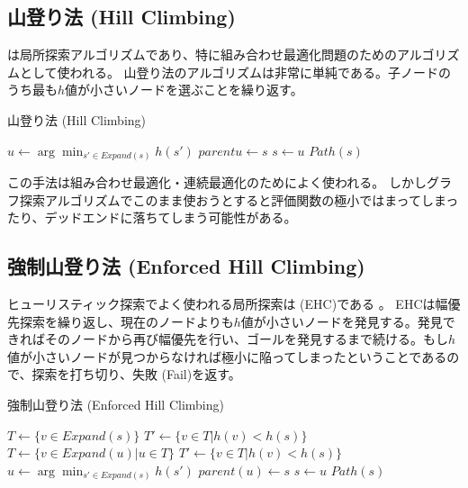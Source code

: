 \subsection{山登り法 (Hill Climbing)}
\label{sec:hill-climbing}
は局所探索アルゴリズムであり、特に組み合わせ最適化問題のためのアルゴリズムとして使われる。
山登り法のアルゴリズムは非常に単純である。子ノードのうち最も$h$値が小さいノードを選ぶことを繰り返す。

\begin{algorithm}
\caption{山登り法 (Hill Climbing)}
	 {
	  $u \leftarrow \arg \min_{s' \in Expand(s)} h(s')$\;
          $parent{u} \leftarrow s$\;
          $s \leftarrow u$\;
	}
	\Return $Path(s)$
\label{alg:hill-climbing}
\end{algorithm}

この手法は組み合わせ最適化・連続最適化のためによく使われる。
しかしグラフ探索アルゴリズムでこのまま使おうとすると評価関数の極小ではまってしまったり、デッドエンドに落ちてしまう可能性がある。


\subsection{強制山登り法 (Enforced Hill Climbing)}

ヒューリスティック探索でよく使われる局所探索は (EHC)である \cite{hoffmann2005ignoring}。
EHCは幅優先探索を繰り返し、現在のノードよりも$h$値が小さいノードを発見する。発見できればそのノードから再び幅優先を行い、ゴールを発見するまで続ける。もし$h$値が小さいノードが見つからなければ極小に陥ってしまったということであるので、探索を打ち切り、失敗 (Fail)を返す。

\begin{algorithm}
\caption{強制山登り法 (Enforced Hill Climbing)}
	 {
	  $T \leftarrow \{v \in Expand(s)\}$\;
	  $T' \leftarrow \{v \in T | h(v) < h(s) \}$\;
           {
            $T \leftarrow \{v \in Expand(u) | u \in T\}$\;
 	    $T' \leftarrow \{v \in T | h(v) < h(s) \}$\;
          }
	  $u \leftarrow \arg \min_{s' \in Expand(s)} h(s')$\;
          $parent(u) \leftarrow s$\;
          $s \leftarrow u$\;
	}
	\Return $Path(s)$
\label{alg:hill-climbing}
\end{algorithm}


